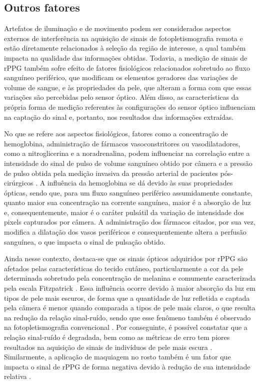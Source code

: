 \subsection{Outros fatores}

Artefatos de iluminação e de movimento podem ser considerados aspectos externos de interferência na aquisição de sinais de fotopletismografia remota e estão diretamente relacionados à seleção da região de interesse, a qual também impacta na qualidade das informações obtidas. Todavia, a medição de sinais de rPPG também sofre efeito de fatores fisiológicos relacionados sobretudo ao fluxo sanguíneo periférico, que modificam os elementos geradores das variações de volume de sangue, e às propriedades da pele, que alteram a forma com que essas variações são percebidas pelo sensor óptico. Além disso, as características da própria forma de medição referentes às configurações do sensor óptico influenciam na captação do sinal e, portanto, nos resultados das informações extraídas.

No que se refere aos aspectos fisiológicos, fatores como a concentração de hemoglobina, administração de fármacos vasoconstritores ou vasodilatadores, como a nitroglicerina e a noradrenalina, podem influenciar na correlação entre a intensidade do sinal de pulso de volume sanguíneo obtido por câmera e a pressão de pulso obtida pela medição invasiva da pressão arterial de pacientes pós-cirúrgicos \cite{trumpp2017relation}. A influência da hemoglobina se dá devido às suas propriedades ópticas, sendo que, para um fluxo sanguíneo periférico assumidamente constante, quanto maior sua concentração na corrente sanguínea, maior é a absorção de luz e, consequentemente, maior é o caráter pulsátil da variação de intensidade dos pixels capturados por câmera. A administração dos fármacos citados, por sua vez, modifica a dilatação dos vasos periféricos e consequentemente altera a perfusão sanguínea, o que impacta o sinal de pulsação obtido. 

Ainda nesse contexto, destaca-se que os sinais ópticos adquiridos por rPPG são afetados pelas características do tecido cutâneo, particularmente a cor da pele determinada sobretudo pela concentração de melanina e comumente caracterizada pela escala Fitzpatrick \cite{fitzpatrick1988validity}. Essa influência ocorre devido à maior absorção da luz em tipos de pele mais escuros, de forma que a quantidade de luz refletida e captada pela câmera é menor quando comparada a tipos de pele mais claros, o que resulta na redução da relação sinal-ruído, sendo que esse fenômeno também é observado na fotopletismografia convencional \cite{fallow2013influence}. Por conseguinte, é possível constatar que a relação sinal-ruído é degradada, bem como as métricas de erro tem piores resultados na aquisição de sinais de indivíduos de pele mais escura \cite{nowara2020meta} \cite{wang2014exploiting}. Similarmente, a aplicação de maquiagem no rosto também é um fator que impacta o sinal de rPPG de forma negativa devido à redução de sua intensidade relativa \cite{wang2020impact}.

